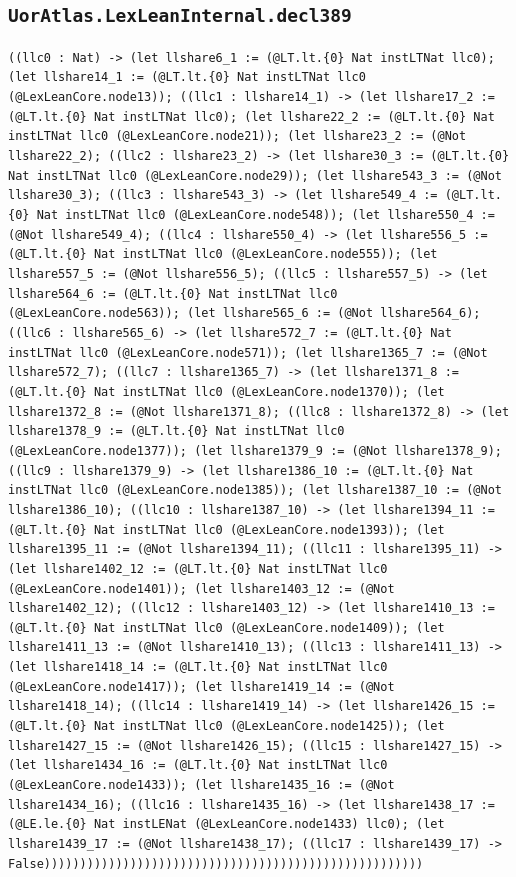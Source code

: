 \documentclass[11pt]{article}
\begin{document}
\subsection*{\texttt{UorAtlas.LexLeanInternal.decl389}}
\noindent\texttt{((llc0 : Nat) -> (let llshare6\_1 := (@LT.lt.\{0\} Nat instLTNat llc0); (let llshare14\_1 := (@LT.lt.\{0\} Nat instLTNat llc0 (@LexLeanCore.node13)); ((llc1 : llshare14\_1) -> (let llshare17\_2 := (@LT.lt.\{0\} Nat instLTNat llc0); (let llshare22\_2 := (@LT.lt.\{0\} Nat instLTNat llc0 (@LexLeanCore.node21)); (let llshare23\_2 := (@Not llshare22\_2); ((llc2 : llshare23\_2) -> (let llshare30\_3 := (@LT.lt.\{0\} Nat instLTNat llc0 (@LexLeanCore.node29)); (let llshare543\_3 := (@Not llshare30\_3); ((llc3 : llshare543\_3) -> (let llshare549\_4 := (@LT.lt.\{0\} Nat instLTNat llc0 (@LexLeanCore.node548)); (let llshare550\_4 := (@Not llshare549\_4); ((llc4 : llshare550\_4) -> (let llshare556\_5 := (@LT.lt.\{0\} Nat instLTNat llc0 (@LexLeanCore.node555)); (let llshare557\_5 := (@Not llshare556\_5); ((llc5 : llshare557\_5) -> (let llshare564\_6 := (@LT.lt.\{0\} Nat instLTNat llc0 (@LexLeanCore.node563)); (let llshare565\_6 := (@Not llshare564\_6); ((llc6 : llshare565\_6) -> (let llshare572\_7 := (@LT.lt.\{0\} Nat instLTNat llc0 (@LexLeanCore.node571)); (let llshare1365\_7 := (@Not llshare572\_7); ((llc7 : llshare1365\_7) -> (let llshare1371\_8 := (@LT.lt.\{0\} Nat instLTNat llc0 (@LexLeanCore.node1370)); (let llshare1372\_8 := (@Not llshare1371\_8); ((llc8 : llshare1372\_8) -> (let llshare1378\_9 := (@LT.lt.\{0\} Nat instLTNat llc0 (@LexLeanCore.node1377)); (let llshare1379\_9 := (@Not llshare1378\_9); ((llc9 : llshare1379\_9) -> (let llshare1386\_10 := (@LT.lt.\{0\} Nat instLTNat llc0 (@LexLeanCore.node1385)); (let llshare1387\_10 := (@Not llshare1386\_10); ((llc10 : llshare1387\_10) -> (let llshare1394\_11 := (@LT.lt.\{0\} Nat instLTNat llc0 (@LexLeanCore.node1393)); (let llshare1395\_11 := (@Not llshare1394\_11); ((llc11 : llshare1395\_11) -> (let llshare1402\_12 := (@LT.lt.\{0\} Nat instLTNat llc0 (@LexLeanCore.node1401)); (let llshare1403\_12 := (@Not llshare1402\_12); ((llc12 : llshare1403\_12) -> (let llshare1410\_13 := (@LT.lt.\{0\} Nat instLTNat llc0 (@LexLeanCore.node1409)); (let llshare1411\_13 := (@Not llshare1410\_13); ((llc13 : llshare1411\_13) -> (let llshare1418\_14 := (@LT.lt.\{0\} Nat instLTNat llc0 (@LexLeanCore.node1417)); (let llshare1419\_14 := (@Not llshare1418\_14); ((llc14 : llshare1419\_14) -> (let llshare1426\_15 := (@LT.lt.\{0\} Nat instLTNat llc0 (@LexLeanCore.node1425)); (let llshare1427\_15 := (@Not llshare1426\_15); ((llc15 : llshare1427\_15) -> (let llshare1434\_16 := (@LT.lt.\{0\} Nat instLTNat llc0 (@LexLeanCore.node1433)); (let llshare1435\_16 := (@Not llshare1434\_16); ((llc16 : llshare1435\_16) -> (let llshare1438\_17 := (@LE.le.\{0\} Nat instLENat (@LexLeanCore.node1433) llc0); (let llshare1439\_17 := (@Not llshare1438\_17); ((llc17 : llshare1439\_17) -> False)))))))))))))))))))))))))))))))))))))))))))))))))))))}\par
\end{document}

